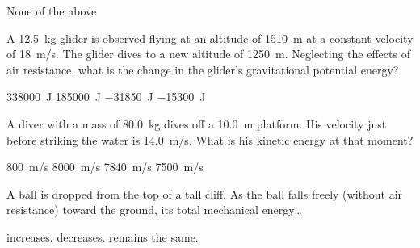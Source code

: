 \documentclass[]{exam}
\begin{document}
\begin{questions}
\begin{center}
\end{center}

\begin{randomizechoices}[keeplast]
    \choice None of the above
\end{randomizechoices}



\question
A \SI{12.5}{kg} glider is observed flying at an altitude of \SI{1510}{m} at a constant velocity of \SI{18}{m/s}. The glider dives to a new altitude of \SI{1250}{m}. Neglecting the effects of air resistance, what is the change in the glider's gravitational potential energy?

\begin{randomizechoices}
\choice \SI{338000}{J}
\choice \SI{185000}{J}
\correctchoice \SI{-31850}{J}
\choice \SI{-15300}{J}
\end{randomizechoices}

\question
A diver with a mass of \SI{80.0}{kg} dives off a \SI{10.0}{m} platform. His velocity just before striking the water is \SI{14.0}{m/s}. What is his kinetic energy at that moment?

\begin{randomizechoices}
\choice \SI{800}{m/s}
\choice \SI{8000}{m/s}
\correctchoice \SI{7840}{m/s}
\choice \SI{7500}{m/s}
\end{randomizechoices}

\question
A ball is dropped from the top of a tall cliff. As the ball falls freely (without air resistance) toward the ground, its total mechanical energy\ldots 

\begin{randomizechoices}
\choice increases.
\choice decreases.
\correctchoice remains the same.
\end{randomizechoices}


\end{questions}
\end{document}
